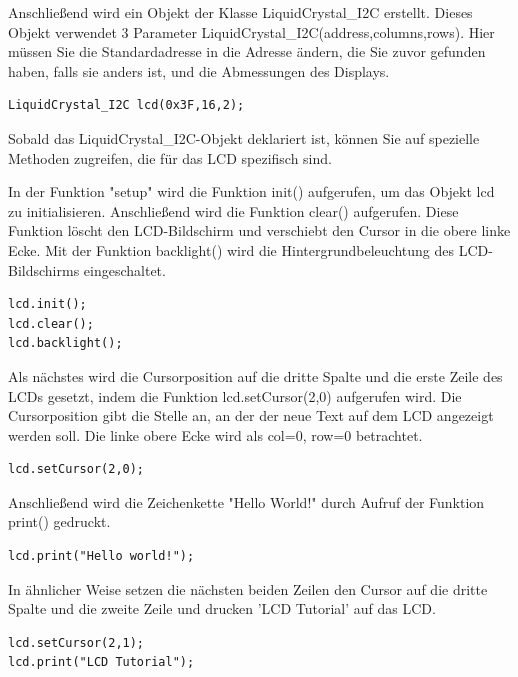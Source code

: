 \documentclass[conference]{IEEEtran}
\begin{document}
Anschließend wird ein Objekt der Klasse LiquidCrystal\_I2C erstellt. Dieses Objekt verwendet 3 Parameter LiquidCrystal\_I2C(address,columns,rows). Hier müssen Sie die Standardadresse in die Adresse ändern, die Sie zuvor gefunden haben, falls sie anders ist, und die Abmessungen des Displays.

\begin{lstlisting}[style=CStyle]
LiquidCrystal_I2C lcd(0x3F,16,2);
\end{lstlisting}\textbf{}

Sobald das LiquidCrystal\_I2C-Objekt deklariert ist, können Sie auf spezielle Methoden zugreifen, die für das LCD spezifisch sind.

In der Funktion "setup" wird die Funktion init() aufgerufen, um das Objekt lcd zu initialisieren. Anschließend wird die Funktion clear() aufgerufen. Diese Funktion löscht den LCD-Bildschirm und verschiebt den Cursor in die obere linke Ecke. Mit der Funktion backlight() wird die Hintergrundbeleuchtung des LCD-Bildschirms eingeschaltet.

\begin{lstlisting}[style=CStyle]
lcd.init();
lcd.clear();         
lcd.backlight();
\end{lstlisting}\textbf{}

Als nächstes wird die Cursorposition auf die dritte Spalte und die erste Zeile des LCDs gesetzt, indem die Funktion lcd.setCursor(2,0) aufgerufen wird. Die Cursorposition gibt die Stelle an, an der der neue Text auf dem LCD angezeigt werden soll. Die linke obere Ecke wird als col=0, row=0 betrachtet.

\begin{lstlisting}[style=CStyle]
lcd.setCursor(2,0);
\end{lstlisting}\textbf{}

Anschließend wird die Zeichenkette "Hello World!" durch Aufruf der Funktion print() gedruckt.

\begin{lstlisting}[style=CStyle]
lcd.print("Hello world!");
\end{lstlisting}\textbf{}

In ähnlicher Weise setzen die nächsten beiden Zeilen den Cursor auf die dritte Spalte und die zweite Zeile und drucken 'LCD Tutorial' auf das LCD.

\begin{lstlisting}[style=CStyle]
lcd.setCursor(2,1);
lcd.print("LCD Tutorial");
\end{lstlisting}\textbf{}
\end{document}
